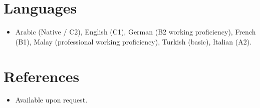 \documentclass[11pt,a4paper,sans]{moderncv}
\begin{document}
\section{Languages}
\vspace{1pt}
\begin{itemize}
\item {Arabic (Native / C2), English (C1), German (B2 working proficiency), French (B1), Malay (professional working proficiency), Turkish (basic), Italian (A2).}
\end{itemize}

\section{References}
\vspace{1pt}
\begin{itemize}
\item{Available upon request.}
\end{itemize}
\end{document}
